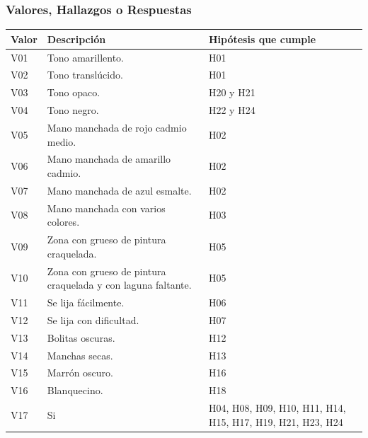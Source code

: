 \documentclass[a4paper,11pt]{article}
\begin{document}
			\subsubsection{Valores, Hallazgos o Respuestas}
			\begin{center}
				\begin{tabular}{| p{2cm} | p{6cm} | p{3cm} |}
					\hline
					\cellcolor[RGB]{224,233,250}\textbf{Valor} &
					\cellcolor[RGB]{224,233,250}\textbf{Descripción} &
					\cellcolor[RGB]{224,233,250}\textbf{Hipótesis que cumple}\\
					\hline
V01 & Tono amarillento. & H01\\
					\hline
V02 & Tono translúcido. & H01\\
					\hline
V03 & Tono opaco. & H20 y H21\\
					\hline
V04 & Tono negro. & H22 y H24\\
					\hline
V05 & Mano manchada de rojo cadmio medio. & H02\\
					\hline
V06 & Mano manchada de amarillo cadmio. & H02\\
					\hline
V07 & Mano manchada de azul esmalte. & H02\\
					\hline
V08 & Mano manchada con varios colores. & H03\\
					\hline
V09 & Zona con grueso de pintura craquelada. & H05\\
					\hline
V10 & Zona con grueso de pintura craquelada y con laguna faltante. & H05\\
					\hline
V11 & Se lija fácilmente. & H06\\
					\hline
V12 & Se lija con dificultad. & H07\\
					\hline
V13 & Bolitas oscuras. & H12\\
					\hline
V14 & Manchas secas. & H13\\
					\hline
V15 & Marrón oscuro. & H16\\
					\hline
V16 & Blanquecino. & H18\\
					\hline
V17 & Si & H04, H08, H09, H10, H11, H14, H15, H17, H19, H21, H23, H24\\
					\hline
				\end{tabular}
			\end{center}
		\newpage
\end{document}
